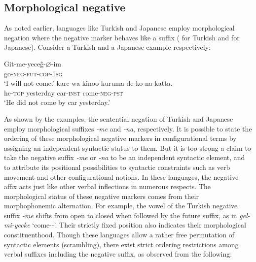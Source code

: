 \documentclass[output=paper
	        ,collection
	        ,collectionchapter
 	        ,biblatex
                ,babelshorthands
                ,newtxmath
                ,draftmode
                ,colorlinks, citecolor=brown
]{langscibook}
\begin{document}
{\begin{exe}
\begin{xlist}
\begin{exe}
\begin{xlist}
%

\section{Morphological negative}

As noted earlier, languages like Turkish and Japanese employ morphological negation where the negative marker behaves like a suffix (\citealt[]{kelepir} for
Turkish and \citealt{Kato:97,Kato:00} for Japanese). Consider
a Turkish and a Japanese example respectively:

\eal
\ex
\label{negation-turkish-jap}
\gll Git-me-yece\~{g}-$\varnothing$-im \\
     go-\textsc{neg-fut-cop}-\textsc{1sg} \\
\glt `I will not come.'
\ex
\gll kare-wa kinoo kuruma-de ko-na-katta. \\
     he-\textsc{top} yesterday car-\textsc{inst} come-\textsc{neg}-\textsc{pst} \\
\glt `He did not come by car yesterday.'
\zl

\noindent
As shown by the examples, the sentential negation of Turkish
and Japanese employ
morphological suffixes \textit{-me} and \textit{-na},
respectively.
It is possible to state the ordering
of these morphological negative markers in configurational
terms by assigning an independent syntactic status to them.
But it is too strong a claim to
take the negative suffix \textit{-me} or \textit{-na}  to be an independent syntactic element,
and to attribute its positional possibilities to syntactic constraints
such as verb movement and other configurational notions.
%
In these languages, the negative affix acts just like
other verbal inflections in numerous respects.
%
%
%
%
%
The morphological status of
these negative markers comes from their morphophonemic alternation.
For example, the vowel of the Turkish negative suffix \textit{-me} shifts from open to closed when followed by the
future suffix, as in \textit{gel-mi-yecke} `come-\NEG-\FUT'.  Their
strictly fixed position also indicates their morphological
constituenthood. Though these languages allow a rather free permutation of
syntactic elements (scrambling), there exist strict ordering restrictions among
verbal suffixes including the negative suffix, as observed from the following:


\end{xlist}
\end{exe}
\end{xlist}
\end{exe}}
\end{document}
